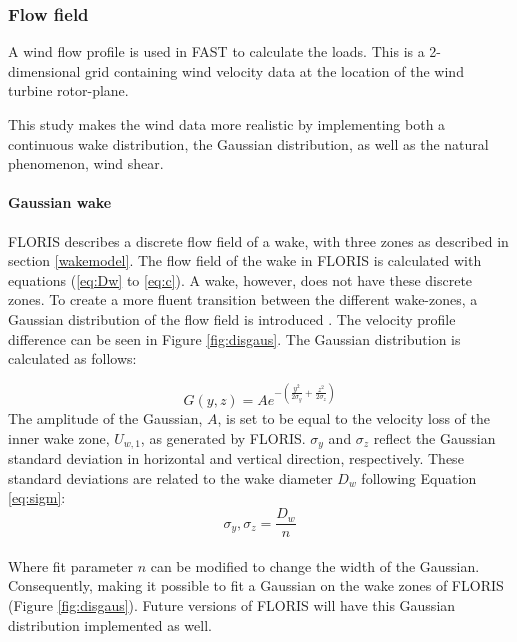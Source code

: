 
\subsubsection{Flow field} \label{sec:flowfield}
A wind flow profile is used in FAST to calculate the loads. This is a 2-dimensional grid containing wind velocity data at the location of the wind turbine rotor-plane.

This study makes the wind data more realistic by implementing both a continuous wake distribution, the Gaussian distribution, as well as the natural phenomenon, wind shear.

\paragraph{Gaussian wake}
FLORIS describes a discrete flow field of a wake, with three zones as described in section \ref{wakemodel}. The flow field of the wake in FLORIS is calculated with equations (\ref{eq:Dw} to \ref{eq:c}). A wake, however, does not have these discrete zones. To create a more fluent transition between the different wake-zones, a Gaussian distribution of the flow field is introduced \cite{Bastankhah2016}. The velocity profile difference can be seen in Figure \ref{fig:disgaus}.  The Gaussian distribution is calculated as follows: 

\begin{equation}
\label{eq:gaus}
G(y, z) = A e^{-\left(\frac{y^2}{2\sigma_y} + \frac{z^2}{2\sigma_z}\right)}
\end{equation}
The amplitude of the Gaussian, $A$, is set to be equal to the velocity loss of the inner wake zone, $U_{w,1}$, as generated by FLORIS. $\sigma_y$ and $\sigma_z$ reflect the Gaussian standard deviation in horizontal and vertical direction, respectively. These standard deviations are related to the wake diameter $D_{w}$ following Equation \ref{eq:sigm}:
\begin{equation}
\label{eq:sigm}
\sigma_y,\sigma_z = \frac{D_{w}}{n} 
\end{equation}
\\
Where fit parameter $n$ can be modified to change the width of the Gaussian. Consequently, making it possible to fit a Gaussian on the wake zones of FLORIS (Figure \ref{fig:disgaus}). Future versions of FLORIS will have this Gaussian distribution implemented as well. 

